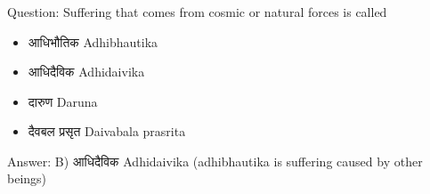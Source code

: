 %
%
%

\begin{frame}[fragile]\frametitle{}

Question: Suffering that comes from cosmic or natural forces is called

\begin{itemize}
\item[A)] आधिभौतिक Adhibhautika
\item[B)] आधिदैविक Adhidaivika
\item[C)] दारुण Daruna
\item[D)] दैवबल प्रसृत Daivabala prasrita
\end{itemize}

Answer: B) आधिदैविक Adhidaivika (adhibhautika is suffering caused by other beings)
\end{frame}

%
%
%

